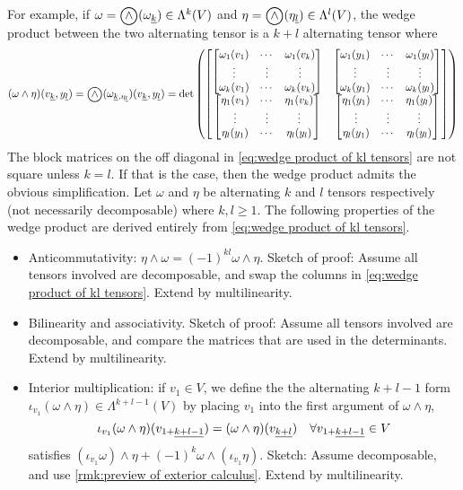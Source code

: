 \documentclass[../main-v2-manifolds.tex]{subfiles}
\begin{document}
For example, if $\omega=\bigowedge(\omega_{\underline{k}})\in \Lambda^k(V)$ and $\eta=\bigowedge(\eta_{\underline{l}})\in\Lambda^l(V)$, the wedge product between the two alternating tensor is a $k+l$ alternating tensor where
\begin{equation}
    (\omega\wedge\eta)(v_{\underline{k}}, y_{\underline{l}}) = \bigowedge(\omega_{\underline{k},\eta_{\underline{l}}})(v_{\underline{k}}, y_{\underline{l}})= \det\qty(
    \mqty[
        \mqty[
        \omega_1(v_1) & \cdots & \omega_1(v_k)  \\
        \vdots        & \vdots & \vdots         \\
        \omega_k(v_1) & \cdots & \omega_k(v_k)
        ] & 
        \mqty[
        \omega_1(y_1) & \cdots & \omega_1(y_l)  \\ 
        \vdots        & \vdots & \vdots         \\ 
        \omega_k(y_1) & \cdots & \omega_k(y_l)
        ] \\
        \mqty[
        \eta_1(v_1) & \cdots & \eta_1(v_k)      \\
        \vdots      & \vdots & \vdots           \\
        \eta_l(y_1) & \cdots & \eta_l(y_l)
        ] & 
        \mqty[
        \eta_1(y_1) & \cdots & \eta_1(y_l)      \\ 
        \vdots      & \vdots & \vdots           \\
        \eta_l(y_1) & \cdots & \eta_l(y_l)
        ]
    ]
    )
    \label{eq:wedge product of kl tensors}
\end{equation}
The block matrices on the off diagonal in \cref{eq:wedge product of kl tensors}  are not square unless $k=l$. If that is the case, then the wedge product admits the obvious simplification. Let $\omega$ and $\eta$ be alternating $k$ and $l$ tensors respectively (not necessarily decomposable) where $k,l\geq 1$. The following properties of the wedge product are derived entirely from \cref{eq:wedge product of kl tensors}. 
\begin{itemize}
    \item Anticommutativity: $\eta\wedge\omega = (-1)^{kl}\omega\wedge\eta$. Sketch of proof: Assume all tensors involved are decomposable, and swap the columns in \cref{eq:wedge product of kl tensors}. Extend by multilinearity.
    \item Bilinearity and associativity. Sketch of proof: Assume all tensors involved are decomposable, and compare the matrices that are used in the determinants. Extend by multilinearity.
    \item Interior multiplication: if $v_1\in V$, we define the the alternating $k+l-1$ form $\iota_{v_1}(\omega\wedge \eta)\in \Lambda^{k+l-1}(V)$ by placing $v_1$ into the first argument of $\omega\wedge\eta$,
    \[
        \iota_{v_1}(\omega\wedge\eta)(\UL{v}[1+][k+l-1]) = (\omega\wedge\eta)(\UL{v}[k+l])\quad\forall \UL{v}[1+][k+l-1]\in V
    \]
    satisfies $(\iota_{v_1}\omega)\wedge \eta + (-1)^{k} \omega\wedge(\iota_{v_1}\eta)$. Sketch: Assume decomposable, and use \cref{rmk:preview of exterior calculus}. Extend by multilinearity.
\end{itemize}
\end{document}
